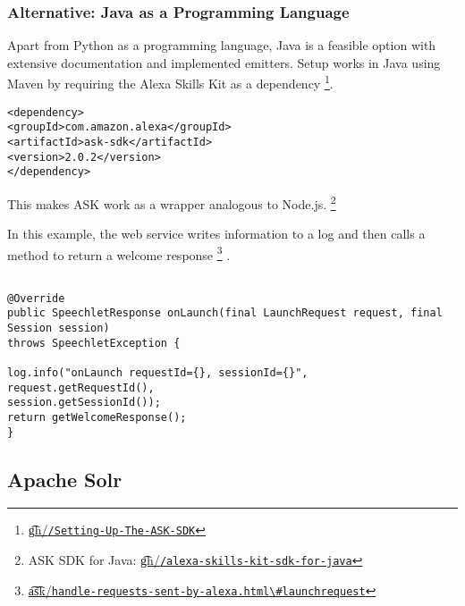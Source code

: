 \subsubsection*{Alternative: Java as a Programming Language }
Apart from Python as a programming language, Java is a feasible option with extensive documentation and implemented emitters.
Setup works in Java using Maven by requiring the Alexa Skills Kit as a dependency \footnote{\href{https://github.com/alexa/alexa-skills-kit-sdk-for-java/wiki/Setting-Up-The-ASK-SDK}{\t{gh}/\lstinline|/Setting-Up-The-ASK-SDK|}}.

\begin{verbatim}
<dependency>
<groupId>com.amazon.alexa</groupId>
<artifactId>ask-sdk</artifactId>
<version>2.0.2</version>
</dependency>
\end{verbatim}

This makes ASK work as a wrapper analogous to Node.js.
\footnote{ASK SDK for Java: %
\href{https://github.com/alexa/alexa-skills-kit-sdk-for-java}{\t{gh}/\lstinline|/alexa-skills-kit-sdk-for-java|}
}


In this example, the web service writes information to a log and then calls a method to return a welcome response \footnote{\href{https://developer.amazon.com/docs/custom-skills/handle-requests-sent-by-alexa.html\#launchrequest}{ \t{a\t{sk}}/\lstinline|handle-requests-sent-by-alexa.html\#launchrequest|}} \cite{alexaDesignGuide}.
\begin{verbatim}

@Override
public SpeechletResponse onLaunch(final LaunchRequest request, final Session session)
throws SpeechletException {

log.info("onLaunch requestId={}, sessionId={}", request.getRequestId(),
session.getSessionId());
return getWelcomeResponse();
}
\end{verbatim}






\subsection*{Apache Solr}
\label{Solr}


